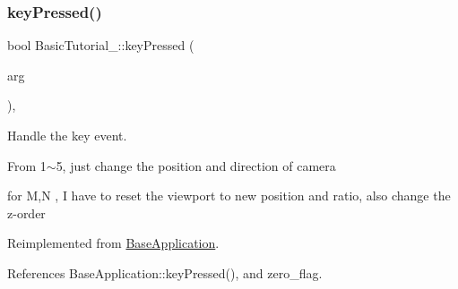 \subsubsection{\texorpdfstring{key\+Pressed()}{keyPressed()}}
{\footnotesize\ttfamily bool Basic\+Tutorial\+\_\+::key\+Pressed (\begin{DoxyParamCaption}\item[{const O\+I\+S\+::\+Key\+Event \&}]{arg }\end{DoxyParamCaption})\hspace{0.3cm}{\ttfamily [protected]}, {\ttfamily [virtual]}}



Handle the key event. 

From 1$\sim$5, just change the position and direction of camera

for M,N , I have to reset the viewport to new position and ratio, also change the z-\/order 

Reimplemented from \hyperlink{class_base_application_acfa977f04e435f18018ece805c1277ec}{Base\+Application}.



References Base\+Application\+::key\+Pressed(), and zero\+\_\+flag.


